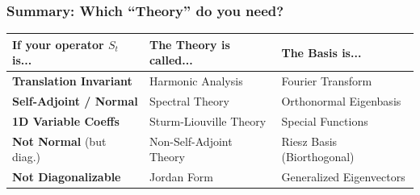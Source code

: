 \documentclass[oneside]{book}
\begin{document}
\subsubsection*{Summary: Which ``Theory'' do you need?}

\begin{center}
\begin{tabular}{|l|l|l|}
\hline
\textbf{If your operator $S_t$ is...} & \textbf{The Theory is called...} & \textbf{The Basis is...} \\ \hline
\textbf{Translation Invariant} & Harmonic Analysis & Fourier Transform \\ \hline
\textbf{Self-Adjoint / Normal} & Spectral Theory & Orthonormal Eigenbasis \\ \hline
\textbf{1D Variable Coeffs} & Sturm-Liouville Theory & Special Functions \\ \hline
\textbf{Not Normal} (but diag.) & Non-Self-Adjoint Theory & Riesz Basis (Biorthogonal) \\ \hline
\textbf{Not Diagonalizable} & Jordan Form & Generalized Eigenvectors \\ \hline
\end{tabular}
\end{center}
\end{document}
